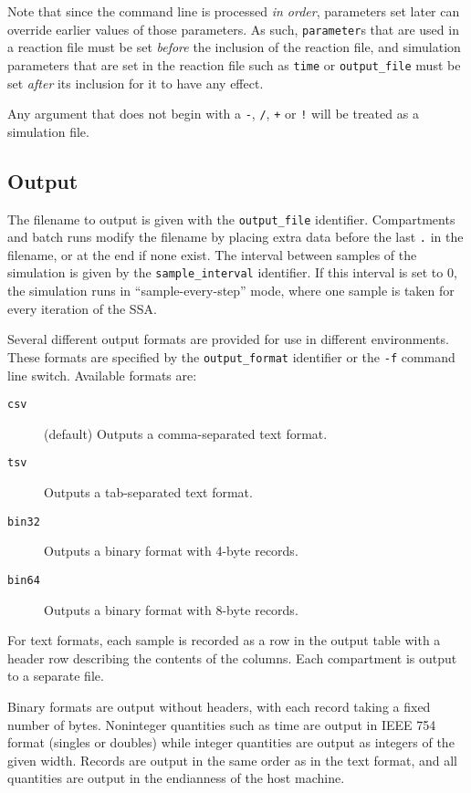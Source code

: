 \documentclass[10pt]{article}
\newcommand{\code}[1]{{\tt {#1}}}
\begin{document}
Note that since the command line is processed \emph{in order}, parameters set later can override earlier values of those parameters. As such, \code{parameter}s that are used in a reaction file must be set \emph{before} the inclusion of the reaction file, and simulation parameters that are set in the reaction file such as \code{time} or \code{output\_file} must be set \emph{after} its inclusion for it to have any effect.

Any argument that does not begin with a \code{-}, \code{/}, \code{+} or \code{!} will be treated as a simulation file.

\subsection{Output}
\label{sec:output}

The filename to output is given with the \code{output\_file} identifier. Compartments and batch runs modify the filename by placing extra data before the last \code{.} in the filename, or at the end if none exist. The interval between samples of the simulation is given by the \code{sample\_interval} identifier. If this interval is set to 0, the simulation runs in ``sample-every-step'' mode, where one sample is taken for every iteration of the SSA.

Several different output formats are provided for use in different environments. These formats are specified by the \code{output\_format} identifier or the \code{-f} command line switch. Available formats are:

\begin{description}
\item[\code{csv}] (default) Outputs a comma-separated text format.
\item[\code{tsv}] Outputs a tab-separated text format.
\item[\code{bin32}] Outputs a binary format with 4-byte records.
\item[\code{bin64}] Outputs a binary format with 8-byte records.
\end{description}

For text formats, each sample is recorded as a row in the output table with a header row describing the contents of the columns. Each compartment is output to a separate file.

Binary formats are output without headers, with each record taking a fixed number of bytes. Noninteger quantities such as time are output in IEEE 754 format (singles or doubles) while integer quantities are output as integers of the given width. Records are output in the same order as in the text format, and all quantities are output in the endianness of the host machine.
\end{document}
